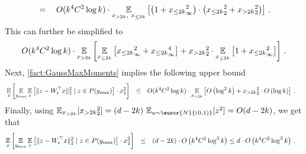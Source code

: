 \documentclass[11pt,letterpaper]{article}
\theoremstyle{plain}
\theoremstyle{definition}
\theoremstyle{remark}
\newcommand{\inparen}[1]{\ensuremath{\left(#1\right)}}
\newcommand{\insquare}[1]{\ensuremath{\left[#1\right]}}
\newcommand{\snorm}[1]{\ensuremath{\ensuremath{\| #1 \|}}}
\let\norm\relax
\newcommand{\norm}[1]{\ensuremath{\left\lVert #1 \right\rVert}}
\newcommand{\E}{\operatornamewithlimits{\mathbb{E}}}
\newcommand{\Ex}{\E}
\newcommand{\customcal}[1]{\euscr{#1}}
\newcommand{\cN}{\customcal{N}}
\newcommand{\normal}[2]{\cN{\inparen{#1,#2}}}
\newcommand{\ymax}{y_{\max}}
\begin{document}
{{\begin{align*}
{                }\\
                &\quad=\quad
                {O(k^4C^2\log{k})}
                \cdot \Ex_{x_{>2k},~x_{\leq 2k}}\insquare{
                    {
                        \inparen{
                            1
                            + \norm{x_{\leq 2k}}_\infty^2
                        }
                        \cdot 
                        \inparen{
                            \norm{x_{\leq 2k}}_2^2 
                            + 
                            \norm{x_{> 2k}}_2^2 
                        }
                    }
                }\,.
            \end{align*}
            This can further be simplified to 
            \[
                {O(k^4C^2\log{k})}
                \cdot \Ex_{x_{>2k}}
                    \insquare{
                        \Ex_{x_{\leq 2k}}\insquare{
                            \norm{x_{\leq 2k}}_\infty^2
                            + \norm{x_{\leq 2k}}_\infty^4
                        }
                        + 
                        \norm{x_{> 2k}}_2^2 \cdot 
                        \Ex_{x_{\leq 2k}}\insquare{
                            1
                            + \norm{x_{\leq 2k}}_\infty^2
                        }
                    }\,.
            \]
            Next, \cref{fact:GaussMaxMoments} implies the following upper bound
            \begin{align*}
                &\Ex_{x}\insquare{
                \Ex_{\ymax}
                \Ex_z\insquare{
                    \snorm{z - W_t^\top x}_2^2  \mid z\in P(\ymax)
                }
                \cdot 
                \norm{x}_2^2 
                }
                ~~\leq~~
                    {O(k^4C^2\log{k})}\cdot \Ex_{x_{> 2k}}\insquare{
                    O\inparen{\log^2{k}}
                    + \norm{x_{> 2k}}_2^2 \cdot O\inparen{\log{k}}
                }\,.
            \end{align*}
            Finally, using $\Ex_{x_{>2k}}[\norm{x_{>2k}}_2^2]=(d-2k)\,\Ex_{u\sim \normal{0}{1}}[z^2]=O(d-2k)$, we get that  
            \begin{align*}
                \Ex_{x}\insquare{
                \Ex_{\ymax}
                \Ex_z\insquare{
                    \snorm{z - W_t^\top x}_2^2  \mid z\in P(\ymax)
                }
                \cdot 
                \norm{x}_2^2 
                }
                &~~\leq~~
                (d-2k)\cdot O\inparen{{k^4C^2} \log^3{k}}
                \leq d\cdot O\inparen{{k^4C^2} \log^3{k}}\,.
            \end{align*}
            
}}
\end{document}
